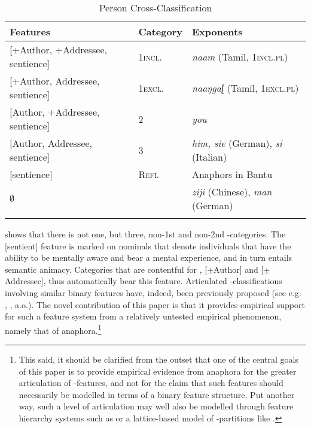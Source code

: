 \documentclass[output=paper, modfonts, nonflat]{langsci/langscibook}
\begin{document}
\begin{table}[h]
	\caption{Person Cross-Classification\label{per1}}
	\begin{tabularx}{\textwidth}{lll}
		\lsptoprule
		Features & Category & Exponents\\\midrule
		{[+Author, +Addressee, sentience]} & \textsc{1incl.} & \textit{naam}
		(Tamil, \textsc{1incl.pl})\\
		{[+Author, \textminus Addressee, sentience]} &  \textsc{1excl.} &
		\textit{naaŋgaɭ}
		(Tamil, \textsc{1excl.pl})\\
		{[\textminus Author, +Addressee, sentience]} & \textsc{2} & \textit{you}\\
		{[\textminus Author, \textminus Addressee, sentience]} & \textsc{3} & \textit{him, sie} (German), \textit{si} (Italian)\\
		\midrule
		{[sentience]} & \textsc{Refl} & Anaphors in Bantu\\
		$\emptyset$ & \nul{} & \textit{ziji} (Chinese),
		\textit{man} (German)\\
		\lspbottomrule
	\end{tabularx}
\end{table}

\noindent   {} shows that there is not one, but three, non-1st and
  non-2nd \person-categories. The [sentient] feature is marked on
  nominals that denote individuals that have the ability to be
  mentally aware and bear a mental experience, and in turn entails
  semantic animacy. Categories that are contentful for \person,
  [$\pm$Author] and [$\pm$Addressee], thus automatically bear this
  feature.  Articulated \person-classifications involving similar
  binary features have, indeed, been previously proposed (see
  e.g. \citealt{nevins:2007}, \citealt{anag:2005}, a.o.). The novel contribution of this
  paper is that it provides empirical support for such a feature
  system from a relatively untested empirical phenomenon, namely that
  of anaphora.\footnote{This said, it should be clarified from the
    outset that one of the central goals of this paper is to provide
    empirical evidence from anaphora for the greater articulation of
    \person-features, and not for the claim that such features should
    necessarily be modelled in terms of a binary feature
    structure. Put another way, such a level of articulation may well
    also be modelled through feature hierarchy systems such as
    \citet{harleyritter:2002} or a lattice-based model of
    \person-partitions like \citet{harbour:2016}.}
\end{document}
